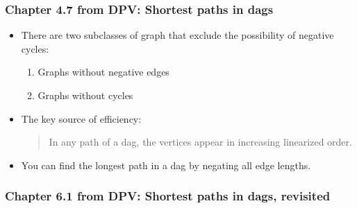 \documentclass[a4paper,11pt]{article}
\begin{document}
\subsubsection{Chapter 4.7 from DPV: Shortest paths in
dags}\label{chapter-4.7-from-dpv-shortest-paths-in-dags}

\begin{itemize}
\item
  There are two subclasses of graph that exclude the possibility of
  negative cycles:

  \begin{enumerate}
  \def\labelenumi{\arabic{enumi}.}
  \itemsep1pt\parskip0pt
  \item
    Graphs without negative edges
  \item
    Graphs without cycles
  \end{enumerate}
\item
  The key source of efficiency:

  \begin{quote}
  In any path of a dag, the vertices appear in increasing linearized
  order.
  \end{quote}
\item
  You can find the longest path in a dag by negating all edge lengths.
\end{itemize}

\subsubsection{Chapter 6.1 from DPV: Shortest paths in dags,
revisited}\label{chapter-6.1-from-dpv-shortest-paths-in-dags-revisited}
\end{document}
